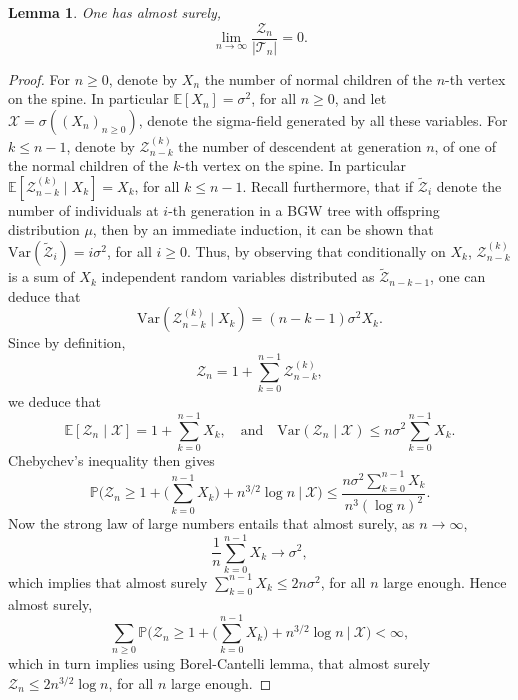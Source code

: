 \documentclass[10pt,a4paper]{amsart}
\newtheorem {lem} {Lemma} [section]
\newcommand{\1}{{\text{\Large $\mathfrak 1$}}}
\begin{document}
\begin{lem}\label{lem:ratiolim}
One has almost surely, 
$$\lim_{n\to \infty} \frac{\mathcal Z_n}{|\mathcal T_n|} = 0. $$
\end{lem}
\begin{proof}
For $n\ge 0$, denote by $X_n$ the number of normal children of the $n$-th vertex on the spine. In particular $\mathbb E[X_n] = \sigma^2$, for all $n\ge 0$, and let $\mathcal X = \sigma((X_n)_{n\ge 0})$, denote the sigma-field generated by all these variables. For $k\le n-1$, denote by $\mathcal Z^{(k)}_{n-k}$ the number of 
descendent at generation $n$, of one of the normal children of the $k$-th vertex on the spine. In particular $\mathbb E[\mathcal Z^{(k)}_{n-k} \mid X_k] = X_k$, for all $k\le n-1$. Recall furthermore, that if $\widetilde {\mathcal Z}_i$ denote the number of individuals at $i$-th generation in a BGW tree with offspring distribution $\mu$, then by an immediate induction, it can be shown that $\text{Var}( \widetilde {\mathcal Z}_i) = i\sigma^2$, for all $i\ge 0$. Thus, by observing that conditionally on $X_k$, 
$\mathcal Z^{(k)}_{n-k}$ is a sum of $X_k$ independent random variables distributed as $ \widetilde {\mathcal Z}_{n-k-1}$, one can deduce that
$$\text{Var}(\mathcal Z^{(k)}_{n-k}\mid X_k) = (n-k-1)\sigma^2 X_k.$$
Since by definition, 
$$\mathcal Z_n = 1+ \sum_{k=0}^{n-1} \mathcal Z^{(k)}_{n-k}, $$ 
we deduce that 
$$\mathbb E[\mathcal Z_n\mid \mathcal X] = 1+ \sum_{k=0}^{n-1} X_k, \quad \text{and}\quad \text{Var}(\mathcal Z_n\mid \mathcal X) \le n \sigma^2\sum_{k=0}^{n-1}X_k. $$ 
Chebychev's inequality then gives 
$$\mathbb P\Big(\mathcal Z_n \ge 1+ \big(\sum_{k=0}^{n-1} X_k\big) + n^{3/2} \log n\ \Big|\ \mathcal X \Big)\le \frac{n \sigma^2 \sum_{k=0}^{n-1} X_k}{n^3(\log n)^2}. $$ 
Now the strong law of large numbers entails that almost surely, as $n\to \infty$, 
$$\frac 1n \sum_{k=0}^{n-1} X_k \to \sigma^2,$$
which implies that almost surely $\sum_{k=0}^{n-1} X_k \le 2n\sigma^2$, for all $n$ large enough. 
Hence almost surely, 
$$\sum_{n\ge 0} \mathbb P\Big(\mathcal Z_n \ge 1+ \big(\sum_{k=0}^{n-1} X_k\big) + n^{3/2}\log n\ \Big|\ \mathcal X \Big)<\infty, $$ 
which in turn implies using Borel-Cantelli lemma, that almost surely $\mathcal Z_n \le 2n^{3/2}\log n$, for all $n$ large enough. 



\end{proof}
\end{document}

